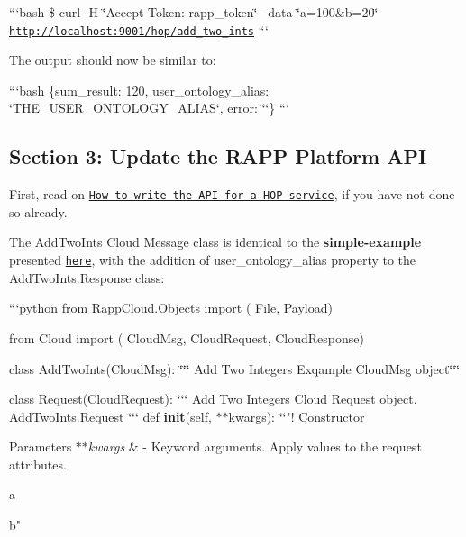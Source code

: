 ```bash \$ curl -\/\-H \char`\"{}\-Accept-\/\-Token\-: rapp\-\_\-token\char`\"{} --data \char`\"{}a=100\&b=20\char`\"{} \href{http://localhost:9001/hop/add_two_ints}{\tt http\-://localhost\-:9001/hop/add\-\_\-two\-\_\-ints} ```

The output should now be similar to\-:

```bash \{sum\-\_\-result\-: 120, user\-\_\-ontology\-\_\-alias\-: \char`\"{}\-T\-H\-E\-\_\-\-U\-S\-E\-R\-\_\-\-O\-N\-T\-O\-L\-O\-G\-Y\-\_\-\-A\-L\-I\-A\-S\char`\"{}, error\-: \char`\"{}\char`\"{}\} ```

\subsection*{Section 3\-: Update the R\-A\-P\-P Platform A\-P\-I}

First, read on \href{https://github.com/rapp-project/rapp-platform/wiki/How-to-write-the-API-for-a-HOP-service%3F}{\tt How to write the A\-P\-I for a H\-O\-P service}, if you have not done so already.

The Add\-Two\-Ints Cloud Message class is identical to the {\bfseries simple-\/example} presented \href{https://github.com/rapp-project/rapp-platform/wiki/A-full-RAPP-Platform-service-creation-example#section-3-update-the-rapp-platform-api}{\tt here}, with the addition of {\ttfamily user\-\_\-ontology\-\_\-alias} property to the {\ttfamily Add\-Two\-Ints.\-Response} class\-:

```python from Rapp\-Cloud.\-Objects import ( File, Payload)

from Cloud import ( Cloud\-Msg, Cloud\-Request, Cloud\-Response)

class Add\-Two\-Ints(\-Cloud\-Msg)\-: \char`\"{}\char`\"{}\char`\"{} Add Two Integers Exqample Cloud\-Msg object\char`\"{}\char`\"{}\char`\"{}

class Request(\-Cloud\-Request)\-: \char`\"{}\char`\"{}\char`\"{} Add Two Integers Cloud Request object. Add\-Two\-Ints.\-Request \char`\"{}\char`\"{}\char`\"{} def {\bfseries init}(self, $\ast$$\ast$kwargs)\-: \char`\"{}\char`\"{}"! Constructor 
\begin{DoxyParams}{Parameters}
{\em $\ast$$\ast$kwargs} & -\/ Keyword arguments. Apply values to the request attributes.
\begin{DoxyItemize}
\item a
\item b"
\end{DoxyItemize}\\
\hline
\end{DoxyParams}
